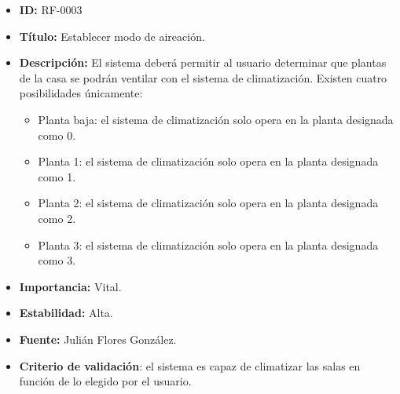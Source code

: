 \begin{itemize}
\item \textbf{ID:} RF-0003
\item \textbf{Título:} Establecer modo de aireación.
\item \textbf{Descripción:} El sistema deberá permitir al usuario determinar que plantas de la casa se podrán ventilar con el sistema de climatización. Existen cuatro posibilidades únicamente:
\begin{itemize}
\item Planta baja: el sistema de climatización solo opera en la planta designada como 0.
\item Planta 1: el sistema de climatización solo opera en la planta designada como 1.
\item Planta 2: el sistema de climatización solo opera en la planta designada como 2.
\item Planta 3: el sistema de climatización solo opera en la planta designada como 3.
\end{itemize}
\item \textbf{Importancia:} Vital.
\item \textbf{Estabilidad:} Alta.
\item \textbf{Fuente:} Julián Flores González.
\item \textbf{Criterio de validación}: el sistema es capaz de climatizar las salas en función de lo elegido por el usuario.
\end{itemize}



